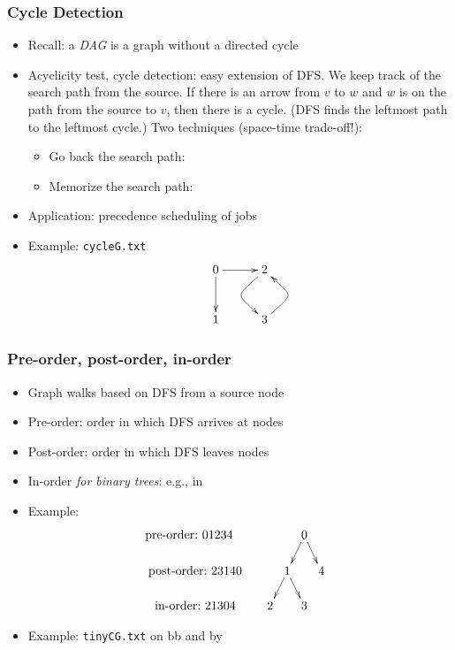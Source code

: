 \documentclass[handout]{beamer}
\newcommand{\git}{https://github.com/marcbezem/INF102/blob/master}
\begin{document}
\begin{frame}
    \frametitle{Cycle Detection}

\begin{itemize}[<+->]

\item Recall: a \emph{DAG} is a graph without a directed cycle
\item Acyclicity test, cycle detection: easy extension of DFS. We keep track of the
search path from the source. If there is an arrow from $v$ to $w$ and $w$ is on the path
from the source to $v$, then there is a cycle. (DFS finds the leftmost path to the leftmost
cycle.) Two techniques (space-time trade-off!):
  \begin{itemize}
  \item Go back the search path:
  \href{\git/programs/graphs/directedGraphs/LinkedListDiG.java}%
{\color{red}{\tt LinkedListDiG.slowCyclist()}}
  \item Memorize the search path:
  \href{\git/programs/graphs/directedGraphs/LinkedListDiG.java}%
{\color{red}{\tt LinkedListDiG.fastCyclist()}} 
  \end{itemize}
\item Application: precedence scheduling of jobs
\item Example: {\tt cycleG.txt}
\[
\xymatrix@R=1cm@C=1cm{
0\ar[d]\ar[r]& 2\ar@(dl,ul)[d]\\
1  & 3 \ar@(ur,dr)[u] 
}
\]
\end{itemize}
\end{frame}


\begin{frame}
    \frametitle{Pre-order, post-order, in-order}

\begin{itemize}[<+->]
\item Graph walks based on DFS from a source node
\item Pre-order: order in which DFS arrives at nodes
\item Post-order: order in which DFS leaves nodes
\item In-order \emph{for binary trees}: e.g., in
\href{\git/programs/searching/elementarySymbolTables/UBST.java}%
{\color{red}{\tt UBST.show()}}
\item Example:
\[\xymatrix@R=.5cm@C=.1cm{
\text{pre-order:~}           01234\quad&&&&0 \ar@{>}[ld]\ar@{>}[rd]&&\\
\text{post-order:~}          23140&&&1\ar@{>}[ld]\ar@{>}[rd]&&4\\
\text{in-order:~}            21304&&2&&3}
\]
\item Example: {\tt tinyCG.txt} on bb and by 
\href{\git/programs/graphs/directedGraphs/LinkedListDiG.java}%
{\color{red}{\tt LinkedListDiG.java}}
\end{itemize}
\end{frame}
\end{document}
